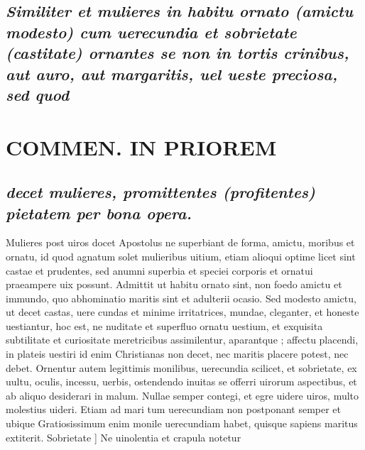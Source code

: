\documentclass{article}
\begin{document}
\begin{pages}
\subsection*{\textit{Similiter et mulieres in habitu ornato (amictu modesto) cum uerecundia et sobrietate (castitate) ornantes se non in tortis crinibus, aut auro, aut margaritis, uel ueste preciosa, sed quod }}
\section*{COMMEN. IN PRIOREM }
\marginpar{[ p.56 ]}
{}
\subsection*{\textit{decet mulieres, promittentes (profitentes) pietatem per bona opera. }}\pstart Mulieres post uiros docet Apostolus ne superbiant de forma, amictu, moribus et ornatu, id quod agnatum solet mulieribus uitium, etiam alioqui optime licet sint castae et prudentes, sed anumni superbia et speciei corporis et ornatui praeampere uix possunt. Admittit ut habitu ornato sint, non foedo amictu et immundo, quo abhominatio maritis sint et adulterii ocasio. Sed modesto amictu, ut decet castas, uere cundas et minime irritatrices, mundae, cleganter, et honeste uestiantur, hoc est, ne nuditate et superfluo ornatu uestium, et exquisita subtilitate et curiositate meretricibus assimilentur, aparantque ; affectu placendi, in plateis uestiri id enim Christianas non decet, nec maritis placere potest, nec debet. Ornentur autem legittimis monilibus, uerecundia scilicet, et sobrietate, ex uultu, oculis, incessu, uerbis, ostendendo inuitas se offerri uirorum aspectibus, et ab aliquo desiderari in malum. Nullae semper contegi, et egre uidere uiros, multo molestius uideri. Etiam ad mari tum uerecundiam non postponant semper et ubique  Gratiosissimum enim monile uerecundiam habet, quisque sapiens maritus extiterit.  \pend\pstart Sobrietate ] Ne uinolentia et crapula notetur  \pend

\end{pages}
\end{document}
